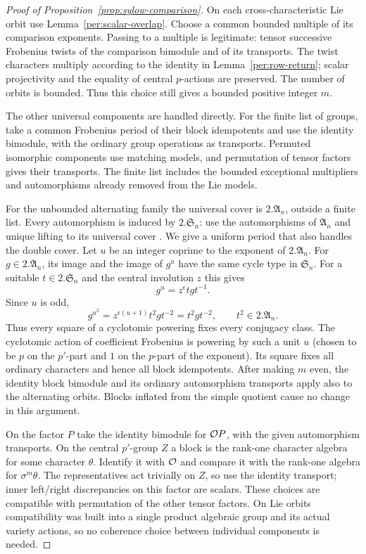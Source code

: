 \begin{proof}[Proof of Proposition~\ref{prop:sylow-comparison}]
On each cross-characteristic Lie orbit use
Lemma~\ref{per:scalar-overlap}.  Choose a common bounded multiple
of its comparison exponents.  Passing to a multiple is legitimate:
tensor successive Frobenius twists of the comparison bimodule and
of its transports.  The twist characters multiply according to the
identity in Lemma~\ref{per:row-return}; scalar projectivity and the
equality of central $p$-actions are preserved.  The number of
orbits is bounded.  Thus this choice still gives a bounded positive
integer $m$.

The other universal components are handled directly.  For the
finite list of groups, take a common Frobenius period of their block
idempotents and use the identity bimodule, with the ordinary group
operations as transports.  Permuted isomorphic components use
matching models, and permutation of tensor factors gives their
transports.  The finite list includes the bounded exceptional
multipliers and automorphisms already removed from the Lie models.

For the unbounded alternating family the universal cover is
$2.\mathfrak A_n$, outside a finite list.  Every automorphism is
induced by $2.\mathfrak S_n$: use the automorphisms of
$\mathfrak A_n$ and unique lifting to its universal cover
\cite[Theorem~2.3 and \S\S2.7.2--2.7.3]{Wilson}.  We give a uniform period that also
handles the double cover.  Let $u$ be an integer coprime to the
exponent of $2.\mathfrak A_n$.  For $g\in2.\mathfrak A_n$,
its image and the image of $g^u$ have the same cycle type in
$\mathfrak S_n$.  For a suitable $t\in2.\mathfrak S_n$ and the
central involution $z$ this gives
\[
 g^u=z^\epsilon t g t^{-1}.
\]
Since $u$ is odd,
\[
 g^{u^2}
   =z^{\epsilon(u+1)}t^2g t^{-2}
   =t^2g t^{-2},\qquad t^2\in2.\mathfrak A_n.
\]
Thus every square of a cyclotomic powering fixes every conjugacy
class.  The cyclotomic action of coefficient Frobenius is powering
by such a unit $u$ (chosen to be $p$ on the $p'$-part and $1$ on the
$p$-part of the exponent).  Its square fixes all ordinary
characters and hence all block idempotents.  After making $m$ even,
the identity block bimodule and its ordinary automorphism
transports apply also to the alternating orbits.  Blocks inflated
from the simple quotient cause no change in this argument.

On the factor $P$ take the identity bimodule for $\mathcal O P$, with the
given automorphism transports.  On the central $p'$-group $Z$ a
block is the rank-one character algebra for some character $\theta$.
Identify it with $\mathcal O$ and compare it with the rank-one algebra for
$\sigma^m\theta$.  The representatives act trivially on $Z$, so
use the identity transport; inner left/right discrepancies on this
factor are scalars.  These choices are compatible with permutation
of the other tensor factors.  On Lie orbits compatibility was built
into a single product algebraic group and its actual variety
actions, so no coherence choice between individual components is
needed.


\end{proof}
